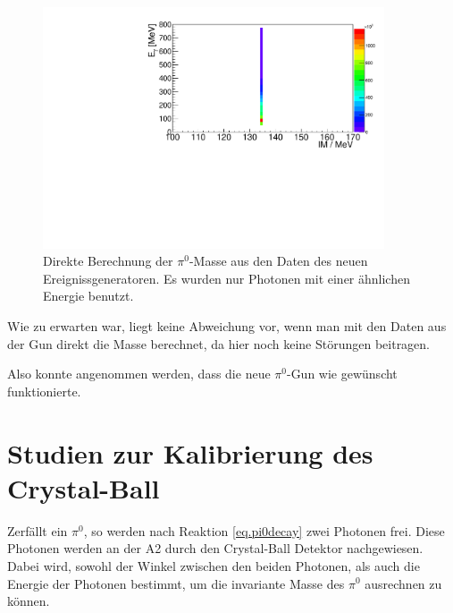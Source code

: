 \documentclass[a4paper,11pt,oneside,final,german,openbib,pdftex]{scrbook}
\begin{document}
{\begin{figure}[h!]
		\centering
		\includegraphics[width=0.9\textwidth]{20172504MCTrueME1}
		\caption[Simulation: Direkte Berechnung der $\pi^0$-Masse aus dem neuen Ereignisgenerator]{Direkte Berechnung der $\pi^0$-Masse aus den Daten des neuen Ereignissgeneratoren. Es wurden nur Photonen mit einer \"ahnlichen Energie benutzt.}

\end{figure}

Wie zu erwarten war, liegt keine Abweichung vor, wenn man mit den Daten aus der Gun direkt die Masse berechnet, da hier noch keine St\"orungen beitragen.

Also konnte angenommen werden, dass die neue $\pi^0$-Gun wie gewünscht funktionierte.











\chapter{Studien zur Kalibrierung des Crystal-Ball}

Zerf\"allt ein $\pi^0$, so werden nach Reaktion \ref{eq.pi0decay} zwei Photonen frei. Diese Photonen werden an der A2 durch den Crystal-Ball Detektor nachgewiesen. Dabei wird, sowohl der Winkel zwischen den beiden Photonen, als auch die Energie der Photonen bestimmt, um die invariante Masse des $\pi^0$ ausrechnen zu k\"onnen.

}
\end{document}
